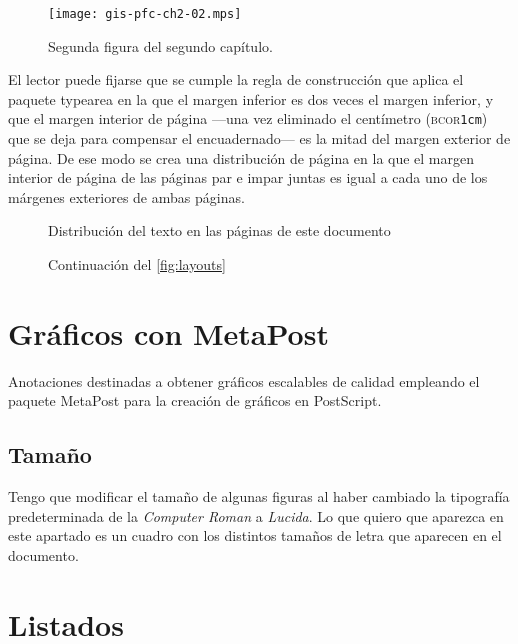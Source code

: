 \begin{figure}
	\begin{center}
		\texttt{[image: gis-pfc-ch2-02.mps]}
	\end{center}
	\caption[Segunda figura del segundo capítulo]{Segunda figura del
	segundo capítulo.}
	\label{fig:ch102}
\end{figure}

El lector puede fijarse que se cumple la regla de construcción que aplica
el paquete \textsf{typearea} en la que el margen inferior es dos veces el
margen inferior, y que el margen interior de página ---una vez eliminado el
centímetro (\textsc{bcor}\texttt{1cm}) que se deja para compensar el
encuadernado--- es la mitad del margen exterior de página. De ese modo se
crea una distribución de página en la que el margen interior de página de
las páginas par e impar juntas es igual a cada uno de los márgenes
exteriores de ambas páginas.

\begin{figure}
	\pagediagram
	\caption{Distribución del texto en las páginas de este documento}
	\label{fig:layouts}
\end{figure}

\begin{figure}\ContinuedFloat
	\currentpage
	\pagedesign
	\caption[]{Continuación del \vref{fig:layouts}}
\end{figure}


\section{Gráficos con MetaPost}

Anotaciones destinadas a obtener gráficos escalables de calidad empleando
el paquete MetaPost para la creación de gráficos en PostScript.


\subsection{Tamaño}

Tengo que modificar el tamaño de algunas figuras al haber cambiado la
tipografía predeterminada de la \emph{Computer Roman} a \emph{Lucida}. Lo
que quiero que aparezca en este apartado es un cuadro con los distintos
tamaños de letra que aparecen en el documento.


\section{Listados}

